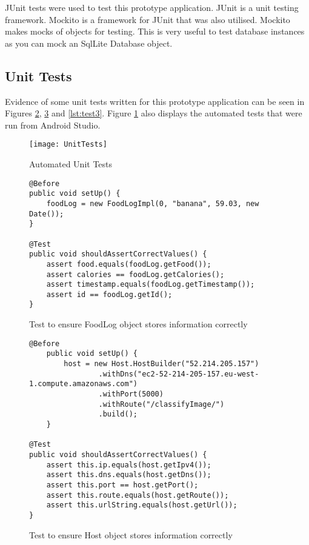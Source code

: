 JUnit tests were used to test this prototype application.
JUnit is a unit testing framework.
Mockito is a framework for JUnit that was also utilised.
Mockito makes mocks of objects for testing.
This is very useful to test database instances as you can mock an SqlLite Database object.

\tocless\subsection{Unit Tests}
Evidence of some unit tests written for this prototype application can be seen in Figures \ref{lst:test1}, \ref{lst:test2} and \ref{lst:test3}.
Figure \ref{fig:unitTests} also displays the automated tests that were run from Android Studio.

\begin{figure}[h]
    \texttt{[image: UnitTests]}
    \caption{Automated Unit Tests}
    \label{fig:unitTests}
\end{figure}

\begin{figure}[h]
\caption{Test to ensure FoodLog object stores information correctly}
\label{lst:test1}
\begin{lstlisting}[style=Java]
@Before
public void setUp() {
    foodLog = new FoodLogImpl(0, "banana", 59.03, new Date());
}

@Test
public void shouldAssertCorrectValues() {
    assert food.equals(foodLog.getFood());
    assert calories == foodLog.getCalories();
    assert timestamp.equals(foodLog.getTimestamp());
    assert id == foodLog.getId();
}
\end{lstlisting}
\end{figure}

\begin{figure}[h]
\caption{Test to ensure Host object stores information correctly}
\label{lst:test2}
\begin{lstlisting}[style=Java]
@Before
    public void setUp() {
        host = new Host.HostBuilder("52.214.205.157")
                .withDns("ec2-52-214-205-157.eu-west-1.compute.amazonaws.com")
                .withPort(5000)
                .withRoute("/classifyImage/")
                .build();
    }

@Test
public void shouldAssertCorrectValues() {
    assert this.ip.equals(host.getIpv4());
    assert this.dns.equals(host.getDns());
    assert this.port == host.getPort();
    assert this.route.equals(host.getRoute());
    assert this.urlString.equals(host.getUrl());
}
\end{lstlisting}
\end{figure}

